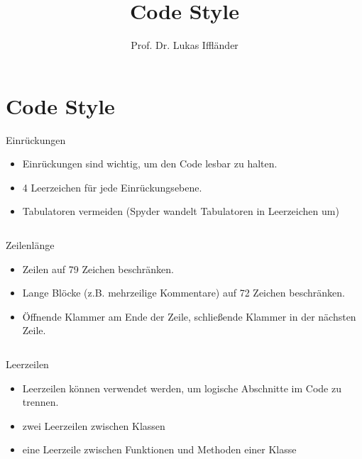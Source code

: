 \documentclass[xelatex,aspectratio=169]{beamer}
\title{Code Style}
\author{Prof. Dr. Lukas Iffländer}
\institute{HTW Dresden}
\date{}
\begin{document}
\begin{frame}
    \titlepage
\end{frame}

\section{Code Style}

\begin{frame}{Einrückungen}
    \begin{itemize}
        \item Einrückungen sind wichtig, um den Code lesbar zu halten.
        \item 4 Leerzeichen für jede Einrückungsebene.
        \item Tabulatoren vermeiden (Spyder wandelt Tabulatoren in Leerzeichen um)
    \end{itemize}
    \inputminted{python}{src/style_indentation.py}

\end{frame}

\begin{frame}{Zeilenlänge}
    \begin{itemize}
        \item Zeilen auf 79 Zeichen beschränken.
        \item Lange Blöcke (z.B. mehrzeilige Kommentare) auf 72 Zeichen beschränken.
        \item Öffnende Klammer am Ende der Zeile, schließende Klammer in der nächsten Zeile.
    \end{itemize}
    \inputminted[firstline=14]{python}{src/style_length.py}
\end{frame}

\begin{frame}{Leerzeilen}
    \begin{itemize}
        \item Leerzeilen können verwendet werden, um logische Abschnitte im Code zu trennen.
        \item zwei Leerzeilen zwischen Klassen
        \item eine Leerzeile zwischen Funktionen und Methoden einer Klasse
    \end{itemize}
    \inputminted{python}{src/style_blank_lines.py}
\end{frame}
\end{document}
